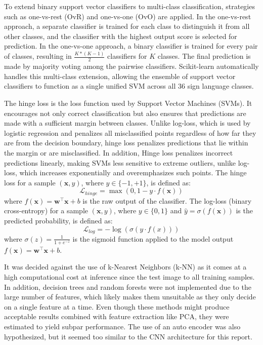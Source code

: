 \documentclass[a4, 10 pt, conference]{ieeeconf}  %
\begin{document}
To extend binary support vector classifiers to multi-class classification, strategies such as one-vs-rest (OvR) and one-vs-one (OvO) are applied. In the one-vs-rest approach, a separate classifier is trained for each class to distinguish it from all other classes, and the classifier with the highest output score is selected for prediction. In the one-vs-one approach, a binary classifier is trained for every pair of classes, resulting in 
$\frac{K*(K-1)}{2}$ classifiers for $K$ classes. The final prediction is made by majority voting among the pairwise classifiers. Scikit-learn automatically handles this multi-class extension, allowing the ensemble of support vector classifiers to function as a single unified SVM across all 36 sign language classes.

The hinge loss is the loss function used by Support Vector Machines (SVMs). It encourages not only correct classification but also ensures that predictions are made with a sufficient margin between classes. Unlike log-loss, which is used by logistic regression and penalizes all misclassified points regardless of how far they are from the decision boundary, hinge loss penalizes predictions that lie within the margin or are misclassified. In addition, Hinge loss penalizes incorrect predictions linearly, making SVMs less sensitive to extreme outliers, unlike log-loss, which increases exponentially and overemphasizes such points.
The hinge loss for a sample $(\mathbf{x}, y)$, where $y \in \{-1, +1\}$, is defined as:
\[
\mathcal{L}_{hinge} = \max(0, 1 - y \cdot f(\mathbf{x}))
\]
where $f(\mathbf{x}) = \mathbf{w}^\top \mathbf{x} + b$ is the raw output of the classifier.
The log-loss (binary cross-entropy) for a sample $(\mathbf{x}, y)$, where $y \in \{0, 1\}$ and $\hat{y} = \sigma(f(\mathbf{x}))$ is the predicted probability, is defined as:
\[
\mathcal{L}_{log} = - \log(\sigma(y \cdot f(x)))
\]
where $\sigma(z) = \frac{1}{1 + e^{-z}}$ is the sigmoid function applied to the model output $f(\mathbf{x}) = \mathbf{w}^\top \mathbf{x} + b$.

It was decided against the use of k-Nearest Neighbors (k-NN) as it comes at a high
computational cost at inference since the test image to all training samples. In addition, 
decision trees and random forests were not implemented due to the large number of features, 
which likely makes them unsuitable as they only decide on a single feature at a time. Even though
these methods might produce acceptable results combined with feature extraction like PCA, they
were estimated to yield subpar performance. The use of an auto encoder was also hypothesized,
but it seemed too similar to the CNN architecture for this report. 
\end{document}
